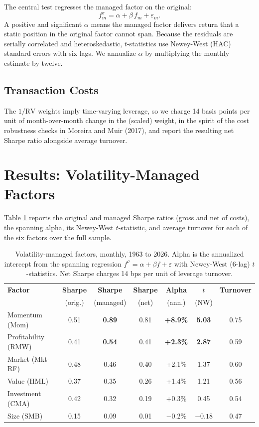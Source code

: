\documentclass[11pt]{article}
\begin{document}
The central test regresses the managed factor on the original:
\begin{equation}
    f^{\sigma}_m = \alpha + \beta\, f_m + \varepsilon_m .
\end{equation}
A positive and significant $\alpha$ means the managed factor delivers return that a static position in the original factor cannot span. Because the residuals are serially correlated and heteroskedastic, $t$-statistics use Newey-West (HAC) standard errors with six lags. We annualize $\alpha$ by multiplying the monthly estimate by twelve.

\subsection{Transaction Costs}

The $1/\mathrm{RV}$ weights imply time-varying leverage, so we charge 14 basis points per unit of month-over-month change in the (scaled) weight, in the spirit of the cost robustness checks in Moreira and Muir (2017), and report the resulting net Sharpe ratio alongside average turnover.

\section{Results: Volatility-Managed Factors}

Table \ref{tab:vm} reports the original and managed Sharpe ratios (gross and net of costs), the spanning alpha, its Newey-West $t$-statistic, and average turnover for each of the six factors over the full sample.

\begin{table}[H]
    \centering
    \begin{tabular}{lcccccc}
        \toprule
        \textbf{Factor} & \textbf{Sharpe} & \textbf{Sharpe} & \textbf{Sharpe} & \textbf{Alpha} & \textbf{$t$} & \textbf{Turnover} \\
         & (orig.) & (managed) & (net) & (ann.) & (NW) & \\
        \midrule
        Momentum (Mom)        & 0.51 & \textbf{0.89} & 0.81 & \textbf{+8.9\%} & \textbf{5.03} & 0.75 \\
        Profitability (RMW)   & 0.41 & \textbf{0.54} & 0.41 & \textbf{+2.3\%} & \textbf{2.87} & 0.59 \\
        Market (Mkt-RF)       & 0.48 & 0.46 & 0.40 & +2.1\% & 1.37 & 0.60 \\
        Value (HML)           & 0.37 & 0.35 & 0.26 & +1.4\% & 1.21 & 0.56 \\
        Investment (CMA)      & 0.42 & 0.32 & 0.19 & +0.3\% & 0.45 & 0.54 \\
        Size (SMB)            & 0.15 & 0.09 & 0.01 & $-0.2$\% & $-0.18$ & 0.47 \\
        \bottomrule
    \end{tabular}
    \caption{Volatility-managed factors, monthly, 1963 to 2026. Alpha is the annualized intercept from the spanning regression $f^{\sigma}=\alpha+\beta f+\varepsilon$ with Newey-West (6-lag) $t$-statistics. Net Sharpe charges 14 bps per unit of leverage turnover.}
    \label{tab:vm}
\end{table}
\end{document}
